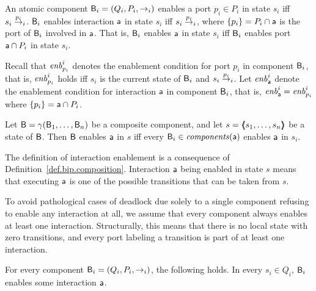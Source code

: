 \begin{definition}\label{def.bip.enablement} 
An atomic component $\B_i = (Q_i,P_i,\goesto_i)$ enables a port $p_i \in P_i$ in state $s_i$ iff $s_i \goesto[p_i]_i$.
$\B_i$ enables interaction $\act$ in state $s_i$ iff $s_i \goesto[p_i]_i$, where $\set{p_i} = P_i \ints \act$ is the port of $\B_i$ involved in $\act$.
That is, $\B_i$ enables $\act$ in state $s_i$ iff $\B_i$ enables port $\act \ints P_i$ in state $s_i$. 

Recall that $\gd{p_i}{i}$ denotes the enablement condition for port $p_i$ in component $\B_i$, that is, $\gd{p_i}{i}$ holds iff
$s_i$ is the current state of $\B_i$ and $s_i \goesto[p_i]_i$.
Let $\gd{\act}{i}$ denote the enablement condition for interaction $\act$ in
component $\B_i$, that is,  $\gd{\act}{i} = \gd{p_i}{i}$ where $\set{p_i} = \act \ints P_i$.  

Let $\B = \gamma(\B_1,\dots,\B_n)$ be a composite component, and let $s =
\tpl{s_1,\ldots,s_n}$ be a state of $\B$.  Then $\B$ enables $\act$ in $s$
iff every $\B_i \in \cmps{\act}$ enables $\act$ in $s_i$.  
\end{definition}
%
The definition of  interaction enablement is a consequence of 
Definition~\ref{def.bip.composition}. 
Interaction $\act$ being enabled in state $s$ means that executing
$\act$ is one of the possible transitions that can be taken from $s$.

To avoid pathological cases of deadlock due solely to a single component refusing to enable any interaction at all, 
we assume that every component always enables at least one interaction.
Structurally, this means that there is no local state with zero transitions, 
and every port labeling a transition is 
part of at least one interaction. 

\begin{definition} \label{def.bip.local-enablement}
For every component  $\B_i = (Q_i,P_i,\goesto_i)$, the following holds. 
  In every $s_i \in Q_i$, $\B_i$ enables some
interaction $\act$.
\end{definition}

